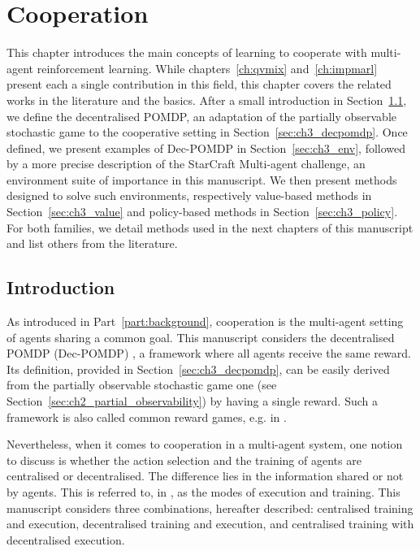 \chapter{Cooperation}\label{ch:cooperation}
\begin{chapter_outline}

This chapter introduces the main concepts of learning to cooperate with multi-agent reinforcement learning.
While chapters~\ref{ch:qvmix} and~\ref{ch:impmarl} present each a single contribution in this field, this chapter covers the related works in the literature and the basics.
After a small introduction in Section~\ref{sec:ch3_intro}, we define the decentralised POMDP, an adaptation of the partially observable stochastic game to the cooperative setting in Section~\ref{sec:ch3_decpomdp}.
Once defined, we present examples of Dec-POMDP in Section~\ref{sec:ch3_env}, followed by a more precise description of the StarCraft Multi-agent challenge, an environment suite of importance in this manuscript.
We then present methods designed to solve such environments, respectively value-based methods in Section~\ref{sec:ch3_value} and policy-based methods in Section~\ref{sec:ch3_policy}.
For both families, we detail methods used in the next chapters of this manuscript and list others from the literature.

\end{chapter_outline}

\section{Introduction}
\label{sec:ch3_intro}
As introduced in Part~\ref{part:background}, cooperation is the multi-agent setting of agents sharing a common goal.
This manuscript considers the decentralised POMDP (Dec-POMDP) \citep{DecPomdp}, a framework where all agents receive the same reward.
Its definition, provided in Section~\ref{sec:ch3_decpomdp}, can be easily derived from the partially observable stochastic game one (see Section~\ref{sec:ch2_partial_observability}) by having a single reward.
Such a framework is also called common reward games, e.g. in \cite{marl-book}.

Nevertheless, when it comes to cooperation in a multi-agent system, one notion to discuss is whether the action selection and the training of agents are centralised or decentralised.
The difference lies in the information shared or not by agents.
This is referred to, in \citep{marl-book}, as the modes of execution and training.
This manuscript considers three combinations, hereafter described: centralised training and execution, decentralised training and execution, and centralised training with decentralised execution.

